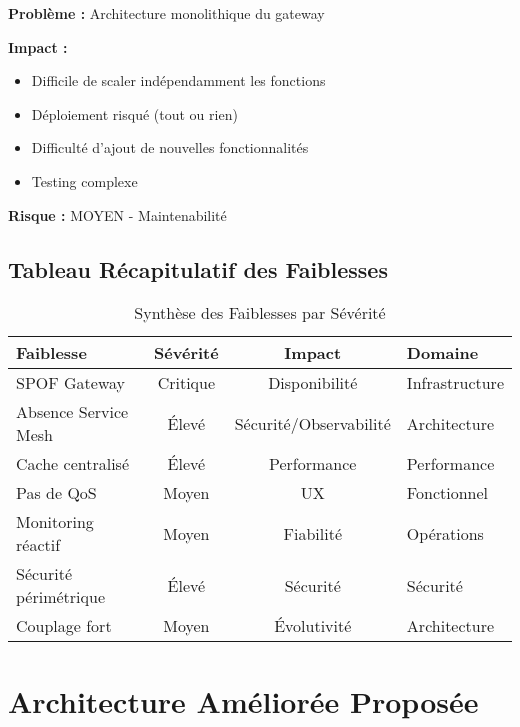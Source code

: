 \documentclass[12pt,a4paper]{article}
\begin{document}
\begin{tcolorbox}[title=\textbf{CRITIQUE 7 : Couplage Fort entre Composants},colback=yellow!10,colframe=yellow!60!black]
\textbf{Problème :} Architecture monolithique du gateway

\textbf{Impact :}
\begin{itemize}[noitemsep]
    \item Difficile de scaler indépendamment les fonctions
    \item Déploiement risqué (tout ou rien)
    \item Difficulté d'ajout de nouvelles fonctionnalités
    \item Testing complexe
\end{itemize}

\textbf{Risque :} \textcolor{yellow!80!black}{MOYEN - Maintenabilité}
\end{tcolorbox}

\newpage
\subsection{Tableau Récapitulatif des Faiblesses}

\begin{table}[h]
\centering
\small
\begin{tabular}{|p{4.5cm}|c|c|p{4cm}|}
\hline
\textbf{Faiblesse} & \textbf{Sévérité} & \textbf{Impact} & \textbf{Domaine} \\
\hline
SPOF Gateway & \cellcolor{red!30}Critique & Disponibilité & Infrastructure \\
\hline
Absence Service Mesh & \cellcolor{orange!30}Élevé & Sécurité/Observabilité & Architecture \\
\hline
Cache centralisé & \cellcolor{orange!30}Élevé & Performance & Performance \\
\hline
Pas de QoS & \cellcolor{yellow!30}Moyen & UX & Fonctionnel \\
\hline
Monitoring réactif & \cellcolor{yellow!30}Moyen & Fiabilité & Opérations \\
\hline
Sécurité périmétrique & \cellcolor{orange!30}Élevé & Sécurité & Sécurité \\
\hline
Couplage fort & \cellcolor{yellow!30}Moyen & Évolutivité & Architecture \\
\hline
\end{tabular}
\caption{Synthèse des Faiblesses par Sévérité}
\end{table}

\newpage
\section{Architecture Améliorée Proposée}
\end{document}
